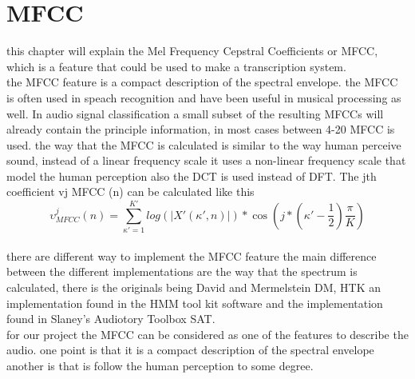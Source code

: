 \section{MFCC}
this chapter will explain the Mel Frequency Cepstral Coefficients or MFCC, which is a feature that could be used to make a transcription system. \\
the MFCC feature is a compact description of the spectral envelope. the MFCC is often used in speach recognition and have been useful in musical processing as well\citep{ACA}. In audio signal classification a small subset of the resulting MFCCs will already contain the principle information, in most cases between 4-20 MFCC is used. the way that the MFCC is calculated is  similar to the way human perceive sound, instead of a linear frequency scale it uses a non-linear frequency scale that model the human perception also the DCT is used instead of DFT\citep{ACA}. The jth coefficient 
vj  MFCC (n) can be calculated like this\citep{ACA}\\
\begin{equation}\label{ eq:MFCC calculation}
	 \upsilon ^j  _{MFCC} (n) = \sum_{\kappa'=1}^{K'} log(\vert X' (\kappa',n) \vert)*\cos(j*(\kappa' - \frac{1}{2})\frac{\pi}{K})
\end{equation}
\\
there are different way to implement the MFCC feature the main difference between the different implementations are the way that the spectrum is calculated, there is the originals being David and Mermelstein DM, HTK an implementation found in the HMM tool kit software and the implementation found in Slaney's Audiotory Toolbox SAT\citep{ACA}.
\\
for our project the MFCC can be considered as one of the features to describe the audio. one point is that it is a compact description of the spectral envelope another is that is follow the human perception to some degree.